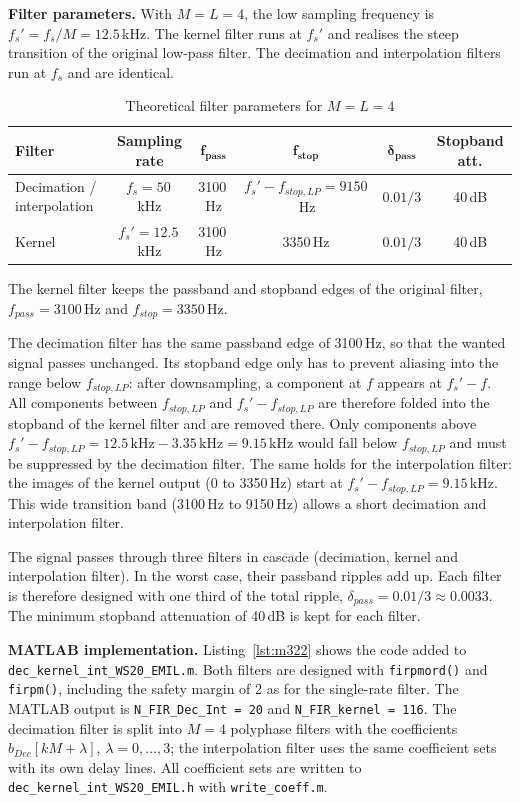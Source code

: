 \documentclass[a4paper,11pt]{article}
\begin{document}
	\noindent\textbf{Filter parameters.} With $M = L = 4$, the low sampling frequency is $f_s' = f_s/M = 12.5$\,kHz. The kernel filter runs at $f_s'$ and realises the steep transition of the original low-pass filter. The decimation and interpolation filters run at $f_s$ and are identical.
	
	\begin{table}[H]
		\centering
		\caption{Theoretical filter parameters for $M = L = 4$}
		\footnotesize
		\begin{tabular}{|l|c|c|c|c|c|}
			\hline
			\textbf{Filter} & \textbf{Sampling rate} & $\boldsymbol{f_{pass}}$ & $\boldsymbol{f_{stop}}$ & $\boldsymbol{\delta_{pass}}$ & \textbf{Stopband att.} \\
			\hline
			Decimation / interpolation & $f_s = 50$\,kHz & 3100\,Hz & $f_s' - f_{stop,LP} = 9150$\,Hz & $0.01/3$ & 40\,dB \\
			Kernel & $f_s' = 12.5$\,kHz & 3100\,Hz & 3350\,Hz & $0.01/3$ & 40\,dB \\
			\hline
		\end{tabular}
	\end{table}
	
	\noindent The kernel filter keeps the passband and stopband edges of the original filter, $f_{pass} = 3100$\,Hz and $f_{stop} = 3350$\,Hz.
	
	The decimation filter has the same passband edge of 3100\,Hz, so that the wanted signal passes unchanged. Its stopband edge only has to prevent aliasing into the range below $f_{stop,LP}$: after downsampling, a component at $f$ appears at $f_s' - f$. All components between $f_{stop,LP}$ and $f_s' - f_{stop,LP}$ are therefore folded into the stopband of the kernel filter and are removed there. Only components above $f_s' - f_{stop,LP} = 12.5\,\text{kHz} - 3.35\,\text{kHz} = 9.15$\,kHz would fall below $f_{stop,LP}$ and must be suppressed by the decimation filter. The same holds for the interpolation filter: the images of the kernel output (0 to 3350\,Hz) start at $f_s' - f_{stop,LP} = 9.15$\,kHz. This wide transition band (3100\,Hz to 9150\,Hz) allows a short decimation and interpolation filter.
	
	The signal passes through three filters in cascade (decimation, kernel and interpolation filter). In the worst case, their passband ripples add up. Each filter is therefore designed with one third of the total ripple, $\delta_{pass} = 0.01/3 \approx 0.0033$. The minimum stopband attenuation of 40\,dB is kept for each filter.
	
	\noindent\textbf{MATLAB implementation.} Listing~\ref{lst:m322} shows the code added to \texttt{dec\_kernel\_int\_WS20\_EMIL.m}. Both filters are designed with \texttt{firpmord()} and \texttt{firpm()}, including the safety margin of 2 as for the single-rate filter. The MATLAB output is \texttt{N\_FIR\_Dec\_Int = 20} and \texttt{N\_FIR\_kernel = 116}. The decimation filter is split into $M = 4$ polyphase filters with the coefficients $b_{Dec}[kM + \lambda]$, $\lambda = 0, \dots, 3$; the interpolation filter uses the same coefficient sets with its own delay lines. All coefficient sets are written to \texttt{dec\_kernel\_int\_WS20\_EMIL.h} with \texttt{write\_coeff.m}.
	
\end{document}
